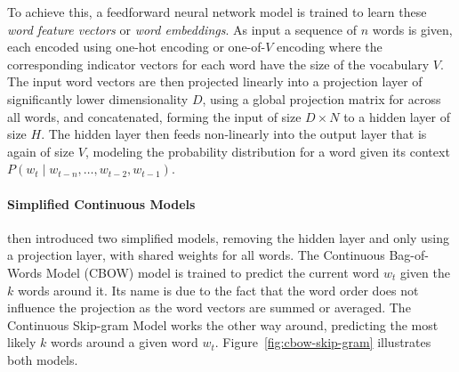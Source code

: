 To achieve this, a feedforward neural network model is trained to learn these \emph{word feature vectors} or \emph{word embeddings}. As input a sequence of $n$ words is given, each encoded using one-hot encoding or one-of-$V$ encoding where the corresponding indicator vectors for each word have the size of the vocabulary $V$. The input word vectors are then projected linearly into a projection layer of significantly lower dimensionality $D$, using a global projection matrix for across all words, and concatenated, forming the input of size $D \times N$ to a hidden layer of size $H$. The hidden layer then feeds non-linearly into the output layer that is again of size $V$, modeling the probability distribution for a word given its context $P(w_t \mid w_{t - n}, \ldots, w_{t - 2}, w_{t - 1})$.

\paragraph{Simplified Continuous Models}

\cite{Mikolov:2013ad} then introduced two simplified models, removing the hidden layer and only using a projection layer, with shared weights for all words. The Continuous Bag-of-Words Model (CBOW) model is trained to predict the current word $w_t$ given the $k$ words around it. Its name is due to the fact that the word order does not influence the projection as the word vectors are summed or averaged. The Continuous Skip-gram Model works the other way around, predicting the most likely $k$ words around a given word $w_t$. Figure~\ref{fig:cbow-skip-gram} illustrates both models.

